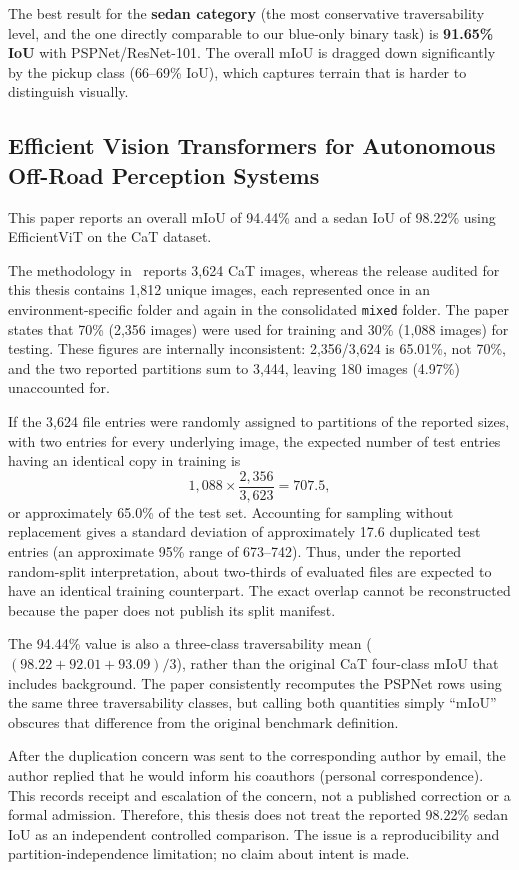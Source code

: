 \documentclass[12pt,a4paper]{report}
\begin{document}
The best result for the \textbf{sedan category} (the most conservative traversability level, and the one directly comparable to our blue-only binary task) is \textbf{91.65\% IoU} with PSPNet/ResNet-101.
The overall mIoU is dragged down significantly by the pickup class (66--69\% IoU), which captures terrain that is harder to distinguish visually.

\subsection{Efficient Vision Transformers for Autonomous Off-Road Perception Systems~\cite{efficientvit_offroad}}

This paper reports an overall mIoU of 94.44\% and a sedan IoU of 98.22\% using EfficientViT on the CaT dataset.

\begin{tcolorbox}[colback=warn!5,colframe=warn,arc=2mm,boxrule=0.9pt,title={\textbf{Comparability limitation / Non-independent evaluation concern}}]
The methodology in~\cite{efficientvit_offroad} reports 3{,}624 CaT images,
whereas the release audited for this thesis contains 1{,}812 unique images,
each represented once in an environment-specific folder and again in the
consolidated \texttt{mixed} folder. The paper states that 70\% (2{,}356 images)
were used for training and 30\% (1{,}088 images) for testing. These figures are
internally inconsistent: 2{,}356/3{,}624 is 65.01\%, not 70\%, and the two
reported partitions sum to 3{,}444, leaving 180 images (4.97\%) unaccounted for.

If the 3{,}624 file entries were randomly assigned to partitions of the
reported sizes, with two entries for every underlying image, the expected
number of test entries having an identical copy in training is
\[
  1{,}088\times\frac{2{,}356}{3{,}623}=707.5,
\]
or approximately 65.0\% of the test set. Accounting for sampling without
replacement gives a standard deviation of approximately 17.6 duplicated test
entries (an approximate 95\% range of 673--742). Thus, under the reported
random-split interpretation, about two-thirds of evaluated files are expected
to have an identical training counterpart. The exact overlap cannot be
reconstructed because the paper does not publish its split manifest.

The 94.44\% value is also a three-class traversability mean
($(98.22+92.01+93.09)/3$), rather than the original CaT four-class mIoU that
includes background. The paper consistently recomputes the PSPNet rows using
the same three traversability classes, but calling both quantities simply
``mIoU'' obscures that difference from the original benchmark definition.

After the duplication concern was sent to the corresponding author by email,
the author replied that he would inform his coauthors (personal correspondence).
This records receipt and escalation of the concern, not a published correction
or a formal admission. Therefore, this thesis does not treat the reported
98.22\% sedan IoU as an independent controlled comparison. The issue is a
reproducibility and partition-independence limitation; no claim about intent is
made.
\end{tcolorbox}
\end{document}
